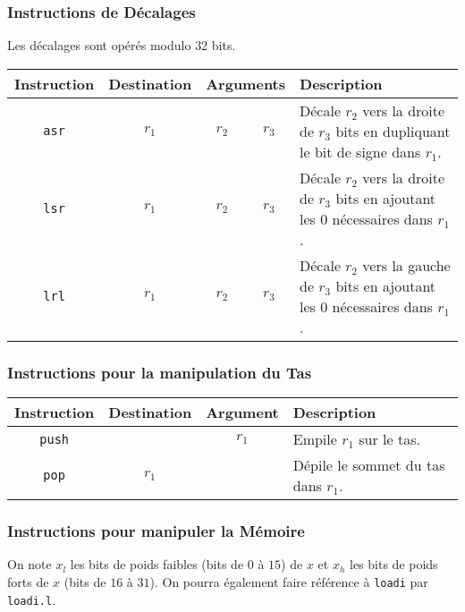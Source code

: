 \documentclass[french, 12pt]{article}
\begin{document}
\subsubsection*{Instructions de Décalages}

Les décalages sont opérés modulo $32$ bits.

\noindent
\begin{tabularx}{\textwidth}{cccc X}
      \toprule
      Instruction  & Destination & \multicolumn{2}{c}{Arguments} & Description                                                                                         \\
      \midrule
      \texttt{asr} & $r_1$       & $r_2$                         & $r_3$       & Décale $r_2$ vers la droite de $r_3$ bits en dupliquant le bit de signe dans $r_1$.   \\
      \texttt{lsr} & $r_1$       & $r_2$                         & $r_3$       & Décale $r_2$ vers la droite de $r_3$ bits en ajoutant les $0$ nécessaires dans $r_1$. \\
      \texttt{lrl} & $r_1$       & $r_2$                         & $r_3$       & Décale $r_2$ vers la gauche de $r_3$ bits en ajoutant les $0$ nécessaires dans $r_1$. \\
      \bottomrule
\end{tabularx}

\subsubsection*{Instructions pour la manipulation du Tas}

\noindent
\begin{tabularx}{\textwidth}{ccc X}
      \toprule
      Instruction   & Destination & Argument & Description                         \\
      \midrule
      \texttt{push} &             & $r_1$    & Empile $r_1$ sur le tas.            \\
      \texttt{pop}  & $r_1$       &          & Dépile le sommet du tas dans $r_1$. \\
      \bottomrule
\end{tabularx}

\subsubsection*{Instructions pour manipuler la Mémoire}

On note $x_l$ les bits de poids faibles (bits de $0$ à $15$) de $x$ et
$x_h$ les bits de poids forts de $x$ (bits de $16$ à $31$). On pourra également
faire référence à \texttt{loadi} par \texttt{loadi.l}.
\end{document}
